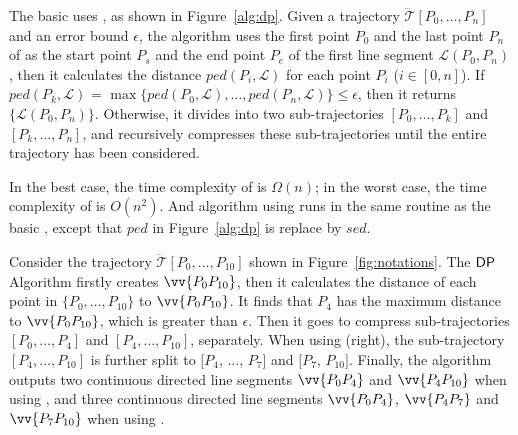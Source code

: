The basic \dpa uses \ped, as shown in Figure~\ref{alg:dp}.
Given a trajectory $\dddot{\mathcal{T}}[P_0, \ldots, P_n]$ and an error bound $\epsilon$, the algorithm uses the first point $P_0$ and the last point $P_n$ of  as the start point $P_s$ and the end point $P_e$ of the first line segment $\mathcal{L}(P_0, P_n)$, then it calculates the distance $ped(P_i, {\mathcal{L}})$ for each point $P_i$ ($i\in[0,n]$). If $ped(P_k, {\mathcal{L}})$ = $\max \{ped(P_0, {\mathcal{L}}), \ldots, ped(P_n, {\mathcal{L}}) \} \le \epsilon$, then it returns $\{\mathcal{L}(P_0,P_n)\}$. Otherwise, it divides  into two sub-trajectories $[P_0, \ldots, P_k]$ and $[P_{k}, \ldots, P_n]$, and recursively compresses these sub-trajectories until the entire trajectory has been considered.

In the best case, the time complexity of \dpa is $\Omega(n)$; in the worst case, the time complexity of \dpa is $O(n^2)$.
%
And algorithm \dpa using \sed \cite{Meratnia:Spatiotemporal} runs in the same routine as the basic \dpa, except that $ped$ in Figure~\ref{alg:dp} is replace by $sed$.






\begin{example}
\label{exm-alg-lsa}
Consider the trajectory $\dddot{\mathcal{T}}[P_0,\ldots,P_{10}]$ shown in Figure~\ref{fig:notations}.
The ${\mathsf{DP}}$ Algorithm firstly creates $\vv{P_0P_{10}}$, then it calculates the distance of each point in $\{P_0,\ldots,P_{10}\}$ to $\vv{P_0P_{10}}$.
It finds that $P_{4}$ has the maximum distance to $\vv{P_0P_{10}}$, which is greater than $\epsilon$. Then it goes to compress sub-trajectories $[P_0, \ldots, P_{4}]$ and $[P_{4}, \ldots, P_{10}]$, separately.
When using \sed (right), the sub-trajectory $[P_4,\ldots, P_{10}]$ is further split to $[P_4$, $\ldots$, $P_7]$ and $[P_7$, $P_{10}]$.
Finally, the algorithm outputs two continuous directed line segments $\vv{P_0P_4}$ and $\vv{P_4P_{10}}$ when using \ped, and three continuous directed line segments $\vv{P_0P_4}$, $\vv{P_4P_7}$ and $\vv{P_7P_{10}}$ when using \sed.
\end{example}


\vspace{-1ex}

